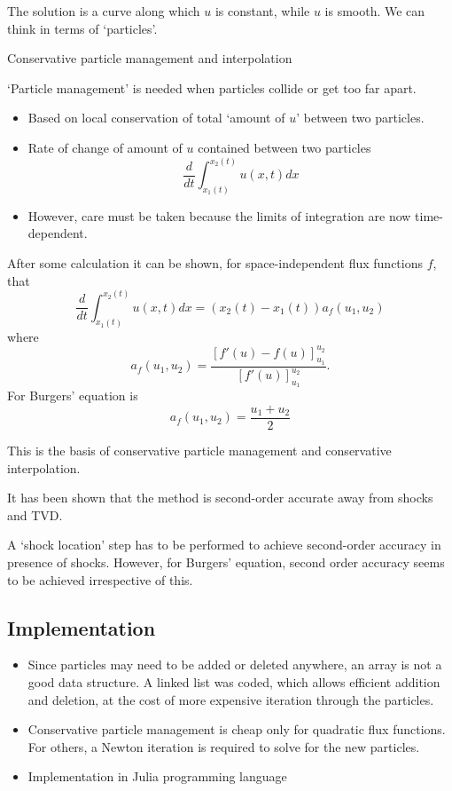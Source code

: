 \documentclass{article}
\begin{document}
The solution is a curve along which $u$ is constant, while $u$ is smooth. We can think in terms of `particles'.
 

Conservative particle management and interpolation

`Particle management' is needed when particles collide or get too far apart.
\begin{itemize}
	\item Based on local conservation of total `amount of $u$' between two particles.
	\item Rate of change of amount of $u$ contained between two particles
	\begin{equation}
		\frac{d}{dt}\int_{x_1(t)}^{x_2(t)}u(x,t)dx
	\end{equation}
	\item However, care must be taken because the limits of integration are now time-dependent.
\end{itemize}
 

After some calculation it can be shown, for space-independent flux functions $f$, that
\begin{equation}
\frac{d}{dt}\int_{x_1(t)}^{x_2(t)}u(x,t)dx = (x_2(t)-x_1(t))a_f(u_1,u_2)
\end{equation}
where
\begin{equation}
a_f(u_1,u_2) = \frac{[f'(u)-f(u)]_{u_1}^{u_2}}{[f'(u)]_{u_1}^{u_2}}.
\end{equation}
For Burgers' equation is
\begin{equation}
a_f(u_1,u_2) = \frac{u_1+u_2}{2}
\end{equation}

This is the basis of conservative particle management and conservative interpolation.
 
It has been shown that the method is second-order accurate away from shocks and TVD.

A `shock location' step has to be performed to achieve second-order accuracy in presence of shocks. However, for Burgers' equation, second order accuracy seems to be achieved irrespective of this.
 

\subsection{Implementation}
\begin{itemize}
	\item Since particles may need to be added or deleted anywhere, an array is not a good data structure. A linked list was coded, which allows efficient addition and deletion, at the cost of more expensive iteration through the particles.
	\item Conservative particle management is cheap only for quadratic flux functions. For others, a Newton iteration is required to solve for the new particles.
	\item Implementation in Julia programming language \cite{julia}
\end{itemize}
\end{document}
